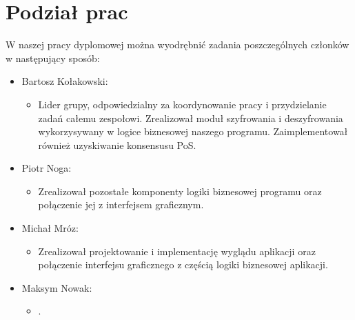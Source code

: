 \section{Podział prac}
W naszej pracy dyplomowej można wyodrębnić zadania poszczególnych członków w następujący sposób:
\begin{itemize}
    \item Bartosz Kołakowski:
        \begin{itemize}
            \item Lider grupy, odpowiedzialny za koordynowanie pracy i przydzielanie zadań całemu zespołowi. Zrealizował moduł szyfrowania i deszyfrowania wykorzysywany w logice biznesowej naszego programu. Zaimplementował również uzyskiwanie konsensusu PoS.  
        \end{itemize}
    \item Piotr Noga:
        \begin{itemize}
            \item Zrealizował pozostałe komponenty logiki biznesowej programu oraz połączenie jej z interfejsem graficznym.  
        \end{itemize}
    \item Michał Mróz:
        \begin{itemize}
            \item Zrealizował projektowanie i implementację wyglądu aplikacji oraz połączenie interfejsu graficznego z częścią logiki biznesowej aplikacji.  
        \end{itemize}
    \item Maksym Nowak:
        \begin{itemize}
            \item <do uzupełnienia>.  
        \end{itemize}
\end{itemize}